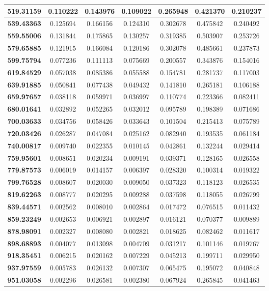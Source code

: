 \documentclass[10pt, a4paper]{article}
\begin{document}
\begin{table}[htbp]
\begin{center}
\begin{tabular}{|c|c|c|c|c|c|c|}
\textbf{519.31159} & 0.110222 & 0.143976 & 0.109022 & 0.265948 & 0.421370 & 0.210237 \\ \hline
\textbf{539.43363} & 0.125694 & 0.166156 & 0.124310 & 0.302678 & 0.475842 & 0.240492 \\ \hline
\textbf{559.55006} & 0.131844 & 0.175865 & 0.130257 & 0.319385 & 0.503907 & 0.253726 \\ \hline
\textbf{579.65885} & 0.121915 & 0.166084 & 0.120186 & 0.302078 & 0.485661 & 0.237873 \\ \hline
\textbf{599.75794} & 0.077236 & 0.111113 & 0.075669 & 0.200557 & 0.343876 & 0.154016 \\ \hline
\textbf{619.84529} & 0.057038 & 0.085386 & 0.055588 & 0.154781 & 0.281737 & 0.117003 \\ \hline
\textbf{639.91885} & 0.050841 & 0.077438 & 0.049432 & 0.141810 & 0.265181 & 0.106188 \\ \hline
\textbf{659.97657} & 0.038118 & 0.059971 & 0.036997 & 0.110774 & 0.223366 & 0.082411 \\ \hline
\textbf{680.01641} & 0.032892 & 0.052265 & 0.032012 & 0.095789 & 0.198389 & 0.071686 \\ \hline
\textbf{700.03633} & 0.034756 & 0.058426 & 0.033643 & 0.101504 & 0.215413 & 0.075789 \\ \hline
\textbf{720.03426} & 0.026287 & 0.047084 & 0.025162 & 0.082940 & 0.193535 & 0.061184 \\ \hline
\textbf{740.00817} & 0.009740 & 0.022355 & 0.010145 & 0.042861 & 0.132244 & 0.029414 \\ \hline
\textbf{759.95601} & 0.008651 & 0.020234 & 0.009191 & 0.039371 & 0.128165 & 0.026558 \\ \hline
\textbf{779.87573} & 0.006019 & 0.014157 & 0.006397 & 0.028320 & 0.100314 & 0.019322 \\ \hline
\textbf{799.76528} & 0.008607 & 0.020030 & 0.009050 & 0.037323 & 0.118123 & 0.026535 \\ \hline
\textbf{819.62263} & 0.008777 & 0.020295 & 0.009288 & 0.037598 & 0.118055 & 0.026799 \\ \hline
\textbf{839.44571} & 0.002562 & 0.008010 & 0.002864 & 0.017472 & 0.076515 & 0.011432 \\ \hline
\textbf{859.23249} & 0.002653 & 0.006921 & 0.002897 & 0.016121 & 0.070377 & 0.009889 \\ \hline
\textbf{878.98091} & 0.002327 & 0.008080 & 0.002821 & 0.018625 & 0.082462 & 0.011617 \\ \hline
\textbf{898.68893} & 0.004077 & 0.013098 & 0.004709 & 0.031217 & 0.101146 & 0.019767 \\ \hline
\textbf{918.35451} & 0.006215 & 0.020162 & 0.007229 & 0.045213 & 0.199711 & 0.029950 \\ \hline
\textbf{937.97559} & 0.005783 & 0.026132 & 0.007307 & 0.065475 & 0.195072 & 0.040848 \\ \hline
\textbf{951.03058} & 0.002296 & 0.026581 & 0.002380 & 0.067924 & 0.265845 & 0.041463 \\ \hline
\end{tabular}
\end{center}
\label{fig:5}
\end{table}
\end{document}
